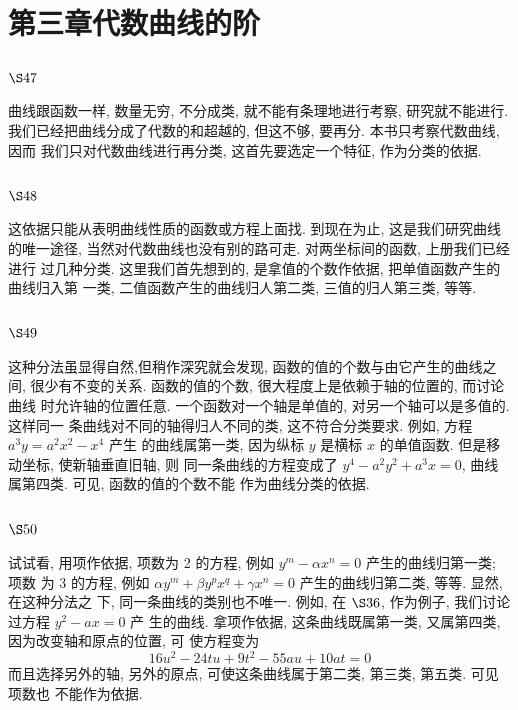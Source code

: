 \chapter{第三章代数曲线的阶}

\section{$\S 47$}

曲线跟函数一样, 数量无穷, 不分成类, 就不能有条理地进行考察, 研究就不能进行. 我们已经把曲线分成了代数的和超越的, 但这不够, 要再分. 本书只考察代数曲线, 因而 我们只对代数曲线进行再分类, 这首先要选定一个特征, 作为分类的依据.

\section{$\S 48$}

这依据只能从表明曲线性质的函数或方程上面找. 到现在为止, 这是我们研究曲线 的唯一途径, 当然对代数曲线也没有别的路可走. 对两坐标间的函数, 上册我们已经进行 过几种分类. 这里我们首先想到的, 是拿值的个数作依据, 把单值函数产生的曲线归入第 一类, 二值函数产生的曲线归人第二类, 三值的归人第三类, 等等.

\section{$\S 49$}

这种分法虽显得自然,但稍作深究就会发现, 函数的值的个数与由它产生的曲线之 间, 很少有不变的关系. 函数的值的个数, 很大程度上是依赖于轴的位置的, 而讨论曲线 时允许轴的位置任意. 一个函数对一个轴是单值的, 对另一个轴可以是多值的. 这样同一 条曲线对不同的轴得归人不同的类, 这不符合分类要求. 例如, 方程 $a^{3} y=a^{2} x^{2}-x^{4}$ 产生 的曲线属第一类, 因为纵标 $y$ 是横标 $x$ 的单值函数. 但是移动坐标, 使新轴垂直旧轴, 则 同一条曲线的方程变成了 $y^{4}-a^{2} y^{2}+a^{3} x=0$, 曲线属第四类. 可见, 函数的值的个数不能 作为曲线分类的依据.

\section{$\S 50$}

试试看, 用项作依据, 项数为 2 的方程, 例如 $y^{m}-\alpha x^{n}=0$ 产生的曲线归第一类; 项数 为 3 的方程, 例如 $\alpha y^{m}+\beta y^{p} x^{q}+\gamma x^{n}=0$ 产生的曲线归第二类, 等等. 显然, 在这种分法之 下, 同一条曲线的类别也不唯一. 例如, 在 $\S 36$, 作为例子, 我们讨论过方程 $y^{2}-a x=0$ 产 生的曲线. 拿项作依据, 这条曲线既属第一类, 又属第四类, 因为改变轴和原点的位置, 可 使方程变为
\[
16 u^{2}-24 t u+9 t^{2}-55 a u+10 a t=0
\]
而且选择另外的轴, 另外的原点, 可使这条曲线属于第二类, 第三类, 第五类. 可见项数也 不能作为依据.

